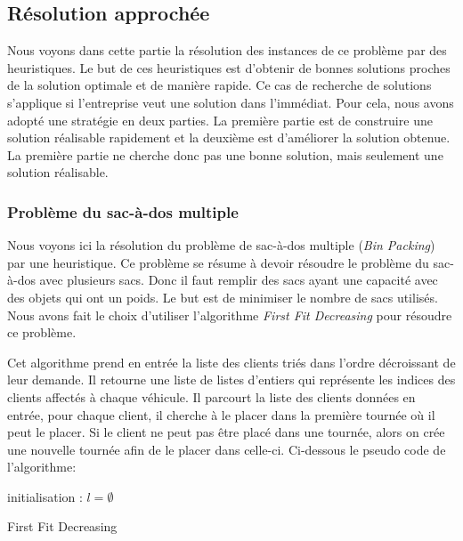 \subsection{Résolution approchée}
\label{S resolution approchee}

Nous voyons dans cette partie la résolution des instances de ce problème par des heuristiques. Le but de ces heuristiques est d'obtenir de bonnes solutions proches de la solution optimale et de manière rapide. Ce cas de recherche de solutions s'applique si l'entreprise veut une solution dans l'immédiat. Pour cela, nous avons adopté une stratégie en deux parties. La première partie est de construire une solution réalisable rapidement et la deuxième est d'améliorer la solution obtenue. La première partie ne cherche donc pas une bonne solution, mais seulement une solution réalisable.

\subsubsection{Problème du sac-à-dos multiple}
\label{sub probleme du sacados}

Nous voyons ici la résolution du problème de sac-à-dos multiple (\textit{Bin Packing}) par une heuristique. Ce problème se résume à devoir résoudre le problème du sac-à-dos avec plusieurs sacs. Donc il faut remplir des sacs ayant une capacité avec des objets qui ont un poids. Le but est de minimiser le nombre de sacs utilisés. Nous avons fait le choix d'utiliser l'algorithme \textit{First Fit Decreasing} pour résoudre ce problème.

Cet algorithme prend en entrée la liste des clients triés dans l'ordre décroissant de leur demande. Il retourne une liste de listes d'entiers qui représente les indices des clients affectés à chaque véhicule. Il parcourt la liste des clients données en entrée, pour chaque client, il cherche à le placer dans la première tournée où il peut le placer. Si le client ne peut pas être placé dans une tournée, alors on crée une nouvelle tournée afin de le placer dans celle-ci. Ci-dessous le pseudo code de l'algorithme:

\begin{algorithm}[H]
    \label{A First Fit Decreasing}
    initialisation : $l = \emptyset$\\
    \caption{First Fit Decreasing}
\end{algorithm}


